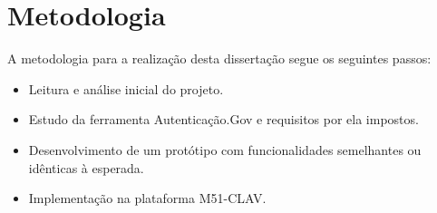 \section{Metodologia}

A metodologia para a realização desta dissertação segue os seguintes passos:

\begin{itemize}
    \item Leitura e análise inicial do projeto.
    \item Estudo da ferramenta Autenticação.Gov e requisitos por ela impostos.
    \item Desenvolvimento de um protótipo com funcionalidades semelhantes ou idênticas à esperada.
    \item Implementação na plataforma M51-CLAV.
\end{itemize}
